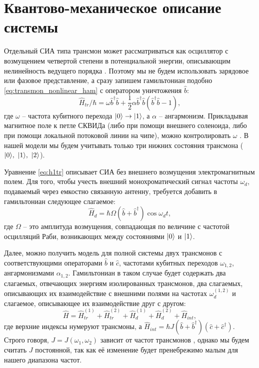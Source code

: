 \documentclass[14pt, a4paper]{extreport}
\DeclarePairedDelimiter\ket{\lvert}{\rangle}
\numberwithin{equation}{section}
\begin{document}
\section{Квантово-механическое описание системы}

Отдельный СИА типа трансмон может рассматриваться как осциллятор с возмущением четвертой степени в потенциальной энергии, описывающим нелинейность ведущего порядка \cite{koch2007charge, yan2018tunable}. Поэтому мы не будем использовать зарядовое или фазовое представление, а сразу запишем гамильтониан подобно \eqref{eq:transmon_nonlinear_ham} с оператором уничтожения $\hat b$:
\begin{equation}
	\hat{{H}}_{tr}/\hbar = \omega \hat 
	b^{\dagger}\hat b +\frac{1}{2}\alpha \hat 
	b^{\dagger}\hat b(\hat b^{\dagger}\hat b-1),
	\label{eq:h1tr}
\end{equation}
где $\omega$ -- частота кубитного перехода $\ket{0} \rightarrow \ket{1}$, а $\alpha$ -- ангармонизм. Прикладывая магнитное поле к петле СКВИДа (либо при помощи внешнего соленоида, либо при помощи локальной потоковой линии на чипе), можно контролировать $\omega$ \cite{koch2007charge}. В нашей модели мы будем учитывать только три нижних состояния трансмона ($\ket{0},\ \ket{1},\ \ket{2}$).

Уравнение \eqref{eq:h1tr} описывает СИА без внешнего возмущения электромагнитным полем. Для того, чтобы учесть внешний монохроматический сигнал частоты $\omega_d$, подаваемый через емкостно связанную антенну, требуется добавить в гамильтониан следующее слагаемое:
\begin{equation}
	\hat H_{d} = \hbar \Omega (\hat b+\hat b^{\dagger}) \cos\omega_d t,
\end{equation}
где $\Omega$ -- это амплитуда возмущения, совпадающая по величине с частотой осцилляций Раби, возникающих между состояниями $\ket{0}$ и $\ket{1}$.

Далее, можно получить модель для полной системы двух трансмонов с соответствующими операторами $\hat b$ и  $\hat c$, частотами кубитных переходов $\omega_{1,2}$, ангармонизмами $\alpha_{1,2}$. Гамильтониан в таком случае будет содержать два слагаемых, отвечающих энергиям изолированных трансмонов, два слагаемых, описывающих их взаимодействие с внешними полями на частотах $\omega_d^{(1, 2)}$ и слагаемое, описывающее их взаимодействие друг с другом:
\begin{equation}\label{Hsystem}
\hat H = \hat H_{tr}^{(1)}+\hat H_{tr}^{(2)}+\hat H_{d}^{(1)}+\hat H_{d}^{(2)}+\hat H_{int},
\end{equation}
где верхние индексы нумеруют трансмоны, а $\hat H_{int} = \hbar J (\hat b +\hat 
b^\dag)(\hat c+\hat c^{\dagger})$. Строго говоря, $J = J(\omega_1, \omega_2)$ зависит от частот трансмонов \cite{koch2007charge}, однако мы будем считать $J$ постоянной, так как её изменение будет пренебрежимо малым для нашего диапазона частот.
\end{document}
